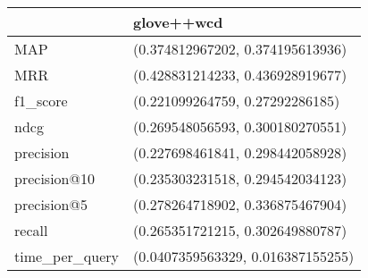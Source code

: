 \begin{tabular}{ll}
\toprule
{} &                         glove++wcd \\
\midrule
MAP            &   (0.374812967202, 0.374195613936) \\
MRR            &   (0.428831214233, 0.436928919677) \\
f1\_score       &    (0.221099264759, 0.27292286185) \\
ndcg           &   (0.269548056593, 0.300180270551) \\
precision      &   (0.227698461841, 0.298442058928) \\
precision@10   &   (0.235303231518, 0.294542034123) \\
precision@5    &   (0.278264718902, 0.336875467904) \\
recall         &   (0.265351721215, 0.302649880787) \\
time\_per\_query &  (0.0407359563329, 0.016387155255) \\
\bottomrule
\end{tabular}
